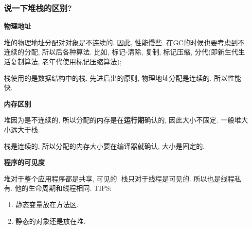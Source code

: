 \documentclass[UTF8]{ctexart}
\begin{document}
\subsubsection{说一下堆栈的区别?}
\textbf{物理地址}
\par
堆的物理地址分配对对象是不连续的. 因此, 性能慢些. 在GC的时候也要考虑到不连续的分配, 所以后各种算法. 比如, 标记-清除, 复制, 标记压缩, 分代(即新生代生活复制算法, 老年代使用标记压缩算法);
\par
栈使用的是数据结构中的栈, 先进后出的原则, 物理地址分配是连续的. 所以性能快.
\par
\textbf{内存区别}
\par
堆因为是不连续的, 所以分配的内存是在\textbf{运行期}确认的, 因此大小不固定. 一般堆大小远大于栈.
\par
栈是连续的, 所以分配的内存大小要在编译器就确认, 大小是固定的.
\par
\textbf{程序的可见度}
\par
堆对于整个应用程序都是共享, 可见的.
栈只对于线程是可见的. 所以也是线程私有. 他的生命周期和线程相同.
TIPS:
\begin{enumerate}
	\item 静态变量放在方法区.
	\item 静态的对象还是放在堆.
\end{enumerate}
\end{document}
